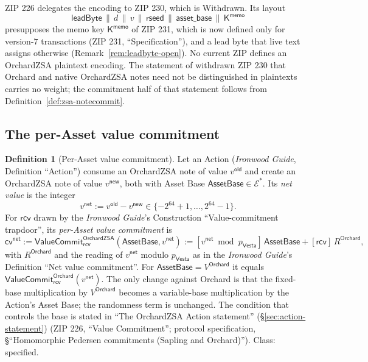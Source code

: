 \documentclass[11pt,a4paper]{article}
\theoremstyle{definition}
\newtheorem{definition}[theorem]{Definition}
\newcommand{\cvsym}{\mathsf{cv}}
\newcommand{\Vesta}{\ensuremath{\mathsf{Vesta}}}
\newcommand{\Ep}{\ensuremath{\mathcal{E}}}
\newcommand{\rcv}{\ensuremath{\mathsf{rcv}}}
\begin{document}
ZIP 226 delegates the encoding to ZIP 230, which is Withdrawn. Its layout
\[
  \mathsf{leadByte} \,\|\, d \,\|\, v \,\|\, \mathsf{rseed} \,\|\,
  \mathsf{asset\_base} \,\|\, \mathsf{K}^{\mathsf{memo}}
\]
presupposes the memo key $\mathsf{K}^{\mathsf{memo}}$ of ZIP 231, which is
now defined only for version-$7$ transactions (ZIP 231, ``Specification''),
and a lead byte that live text assigns otherwise
(Remark~\ref{rem:leadbyte-open}). No current ZIP defines an OrchardZSA
plaintext encoding. The statement of withdrawn ZIP 230 that Orchard and
native OrchardZSA notes need not be distinguished in plaintexts carries no
weight; the commitment half of that statement follows from
Definition~\ref{def:zsa-notecommit}.

\subsection{The per-Asset value commitment}\label{sec:notes-cv}

\begin{definition}[Per-Asset value commitment]\label{def:zsa-cv}
Let an Action (\emph{Ironwood Guide}, Definition ``Action'') consume an
OrchardZSA note of value $v^{\mathsf{old}}$ and create an OrchardZSA note of
value $v^{\mathsf{new}}$, both with Asset Base
$\mathsf{AssetBase} \in \Ep^{*}$. Its \emph{net value} is the integer
\[
  v^{\mathsf{net}} := v^{\mathsf{old}} - v^{\mathsf{new}}
    \in \{-2^{64} + 1, \dots, 2^{64} - 1\}.
\]
For $\rcv$ drawn by the \emph{Ironwood Guide}'s Construction
``Value-commitment trapdoor'', its \emph{per-Asset value commitment} is
\[
  \cvsym^{\mathsf{net}}
  := \mathsf{ValueCommit}^{\mathsf{OrchardZSA}}_{\rcv}(\mathsf{AssetBase},
    v^{\mathsf{net}})
  := [v^{\mathsf{net}} \bmod p_{\Vesta}]\,\mathsf{AssetBase}
    + [\rcv]\,R^{\mathsf{Orchard}},
\]
with $R^{\mathsf{Orchard}}$ and the reading of $v^{\mathsf{net}}$ modulo
$p_{\Vesta}$ as in the \emph{Ironwood Guide}'s Definition ``Net value
commitment''. For $\mathsf{AssetBase} = V^{\mathsf{Orchard}}$ it equals
$\mathsf{ValueCommit}^{\mathsf{Orchard}}_{\rcv}(v^{\mathsf{net}})$. The only
change against Orchard is that the fixed-base multiplication by
$V^{\mathsf{Orchard}}$ becomes a variable-base multiplication by the
Action's Asset Base; the randomness term is unchanged. The condition that
controls the base is stated in ``The OrchardZSA Action statement''
(\S\ref{sec:action-statement}) (ZIP 226, ``Value Commitment''; protocol
specification, \S``Homomorphic Pedersen commitments (Sapling and
Orchard)''). Class: specified.
\end{definition}
\end{document}
